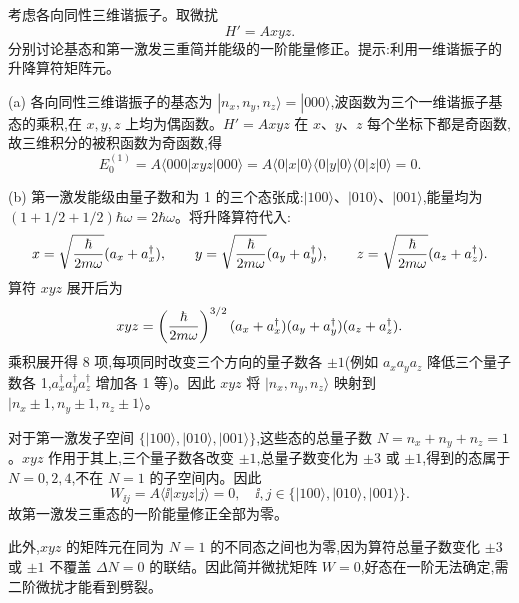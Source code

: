 \begin{question}
考虑各向同性三维谐振子。取微扰
\[
H'=Axyz.
\]
分别讨论基态和第一激发三重简并能级的一阶能量修正。提示:利用一维谐振子的升降算符矩阵元。
\begin{solution}
(a) 各向同性三维谐振子的基态为 $|n_x,n_y,n_z\rangle=|000\rangle$,波函数为三个一维谐振子基态的乘积,在 $x,y,z$ 上均为偶函数。$H'=Axyz$ 在 $x$、$y$、$z$ 每个坐标下都是奇函数,故三维积分的被积函数为奇函数,得
\[
E_0^{(1)}=A\langle000|xyz|000\rangle
=A\langle0|x|0\rangle\langle0|y|0\rangle\langle0|z|0\rangle=0.
\]

(b) 第一激发能级由量子数和为 1 的三个态张成:$|100\rangle$、$|010\rangle$、$|001\rangle$,能量均为 $(1+1/2+1/2)\hbar\omega=2\hbar\omega$。将升降算符代入:
\[
x=\sqrt{\hbar\over2m\omega}(a_x+a_x^\dagger),\qquad
y=\sqrt{\hbar\over2m\omega}(a_y+a_y^\dagger),\qquad
z=\sqrt{\hbar\over2m\omega}(a_z+a_z^\dagger).
\]
算符 $xyz$ 展开后为
\[
xyz = \left({\hbar\over2m\omega}\right)^{3/2}(a_x+a_x^\dagger)(a_y+a_y^\dagger)(a_z+a_z^\dagger).
\]
乘积展开得 8 项,每项同时改变三个方向的量子数各 $\pm1$(例如 $a_x a_y a_z$ 降低三个量子数各 1,$a_x^\dagger a_y^\dagger a_z^\dagger$ 增加各 1 等)。因此 $xyz$ 将 $|n_x,n_y,n_z\rangle$ 映射到 $|n_x\pm1,n_y\pm1,n_z\pm1\rangle$。

对于第一激发子空间 $\{|100\rangle,|010\rangle,|001\rangle\}$,这些态的总量子数 $N=n_x+n_y+n_z=1$。$xyz$ 作用于其上,三个量子数各改变 $\pm1$,总量子数变化为 $\pm3$ 或 $\pm1$,得到的态属于 $N=0,2,4$,不在 $N=1$ 的子空间内。因此
\[
W_{\ii j}=A\langle \ii|xyz|j\rangle = 0,\quad \ii,j\in\{|100\rangle,|010\rangle,|001\rangle\}.
\]
故第一激发三重态的一阶能量修正全部为零。

此外,$xyz$ 的矩阵元在同为 $N=1$ 的不同态之间也为零,因为算符总量子数变化 $\pm3$ 或 $\pm1$ 不覆盖 $\Delta N=0$ 的联结。因此简并微扰矩阵 $W=0$,好态在一阶无法确定,需二阶微扰才能看到劈裂。
\end{solution}
\end{question}

